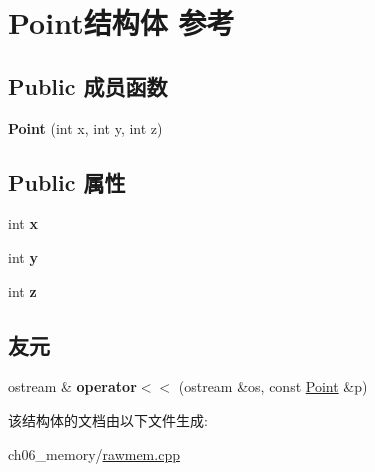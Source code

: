 \hypertarget{struct_point}{}\section{Point结构体 参考}
\label{struct_point}
\subsection*{Public 成员函数}
\begin{DoxyCompactItemize}
\item 
\mbox{\label{struct_point_ae396eca3a7bf1a66a76afe9592930ac3}} 
{\bfseries Point} (int x, int y, int z)
\end{DoxyCompactItemize}
\subsection*{Public 属性}
\begin{DoxyCompactItemize}
\item 
\mbox{\label{struct_point_a8c779e11e694b20e0946105a9f5de842}} 
int {\bfseries x}
\item 
\mbox{\label{struct_point_a2e1b5fb2b2a83571f5c0bc0f66a73cf7}} 
int {\bfseries y}
\item 
\mbox{\label{struct_point_a7035a9eaca7832be6733130d9df290ba}} 
int {\bfseries z}
\end{DoxyCompactItemize}
\subsection*{友元}
\begin{DoxyCompactItemize}
\item 
\mbox{\label{struct_point_a16c222f303e4df1add09f03a1626f9e9}} 
ostream \& {\bfseries operator$<$$<$} (ostream \&os, const \mbox{\hyperlink{struct_point}{Point}} \&p)
\end{DoxyCompactItemize}


该结构体的文档由以下文件生成\+:\begin{DoxyCompactItemize}
\item 
ch06\+\_\+memory/\mbox{\hyperlink{rawmem_8cpp}{rawmem.\+cpp}}\end{DoxyCompactItemize}

